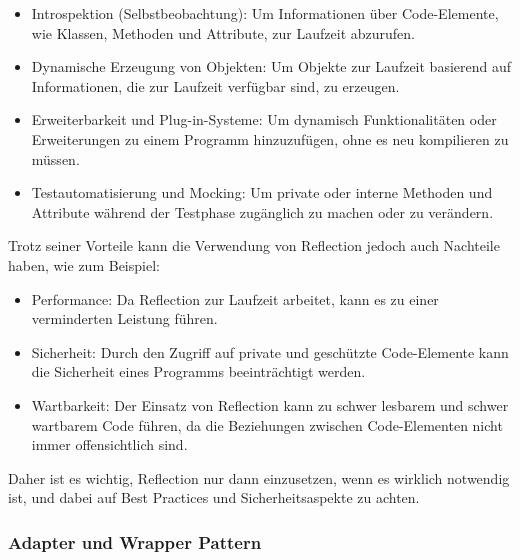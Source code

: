 \documentclass[../vs-script-first-v01.tex]{subfiles}
\begin{document}
\begin{itemize}
\item Introspektion (Selbstbeobachtung): Um Informationen über Code-Elemente, wie Klassen, Methoden und Attribute, zur Laufzeit abzurufen.
\item Dynamische Erzeugung von Objekten: Um Objekte zur Laufzeit basierend auf Informationen, die zur Laufzeit verfügbar sind, zu erzeugen.
\item Erweiterbarkeit und Plug-in-Systeme: Um dynamisch Funktionalitäten oder Erweiterungen zu einem Programm hinzuzufügen, ohne es neu kompilieren zu müssen.
\item Testautomatisierung und Mocking: Um private oder interne Methoden und Attribute während der Testphase zugänglich zu machen oder zu verändern.
\end{itemize}    
Trotz seiner Vorteile kann die Verwendung von Reflection jedoch auch Nachteile haben, wie zum Beispiel:
\begin{itemize}
\item Performance: Da Reflection zur Laufzeit arbeitet, kann es zu einer verminderten Leistung führen.
\item Sicherheit: Durch den Zugriff auf private und geschützte Code-Elemente kann die Sicherheit eines Programms beeinträchtigt werden.
\item Wartbarkeit: Der Einsatz von Reflection kann zu schwer lesbarem und schwer wartbarem Code führen, da die Beziehungen zwischen Code-Elementen nicht immer offensichtlich sind.
\end{itemize}   
Daher ist es wichtig, Reflection nur dann einzusetzen, wenn es wirklich notwendig ist, und dabei auf Best Practices und Sicherheitsaspekte zu achten.

\subsubsection{Adapter und Wrapper Pattern}
\end{document}
